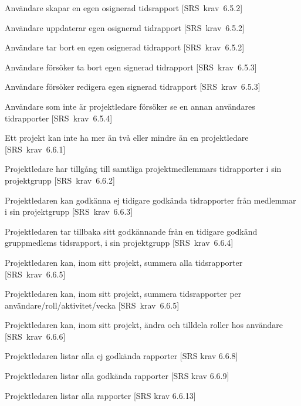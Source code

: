 \documentclass[a4paper]{article}
\begin{document}
\begin{appendices}
\begin{FT}
\item
Användare skapar en  egen osignerad tidsrapport [SRS~krav~6.5.2]

\item
Användare uppdaterar egen osignerad tidrapport [SRS~krav~6.5.2]

\item
Användare tar bort en egen osignerad tidrapport [SRS~krav~6.5.2]

\item
Användare försöker ta bort egen signerad tidrapport [SRS~krav~6.5.3]

\item
Användare försöker redigera egen signerad tidrapport [SRS~krav~6.5.3]

\item
Användare som inte är projektledare försöker se en annan användares tidrapporter [SRS~krav~6.5.4]

\item
Ett projekt kan inte ha mer än två eller mindre än en projektledare [SRS~krav~6.6.1]

\item
Projektledare har tillgång till samtliga projektmedlemmars tidrapporter i sin projektgrupp [SRS~krav~6.6.2]

\item
Projektledaren kan godkänna ej tidigare godkända tidrapporter från medlemmar i sin projektgrupp [SRS~krav~6.6.3]

\item
Projektledaren tar tillbaka sitt godkännande från en tidigare godkänd gruppmedlems tidsrapport, i sin projektgrupp [SRS~krav~6.6.4]

\item
Projektledaren kan, inom sitt projekt, summera alla tidsrapporter [SRS~krav~6.6.5]

\item
Projektledaren kan, inom sitt projekt, summera tidsrapporter per användare/roll/aktivitet/vecka [SRS~krav~6.6.5]

\item
Projektledaren kan, inom sitt projekt, ändra och tilldela roller hos användare [SRS~krav~6.6.6]



\item
Projektledaren listar alla ej godkända rapporter [SRS krav 6.6.8]

\item
Projektledaren listar alla godkända rapporter [SRS krav 6.6.9]

\item
Projektledaren listar alla rapporter [SRS krav 6.6.13]






\end{FT}
\end{appendices}
\end{document}
